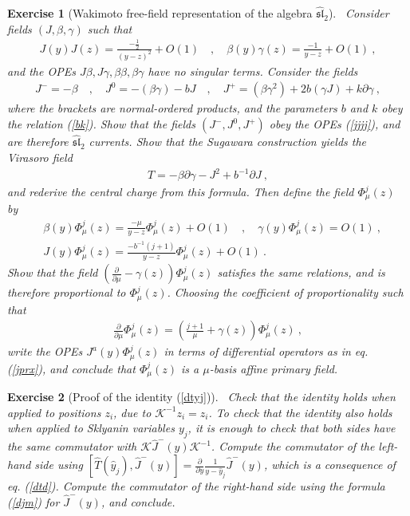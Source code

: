 \documentclass[12pt,a4paper,notitlepage]{report}
\newcommand \p {\partial}
\newcommand \pp[1] {{\frac{\p}{\p #1}}}
\numberwithin{equation}{section}
\theoremstyle{break}
\newtheorem{exo}{Exercise}[chapter]
\begin{document}
\begin{exo}[Wakimoto free-field representation of the algebra $\widehat{\mathfrak{sl}}_2$]
 ~\label{exowaki}
Consider fields $(J,\beta,\gamma)$ such that 
\begin{align}
 J(y)J(z) = \frac{-\frac12}{(y-z)^2} + O(1) \quad , \quad \beta(y)\gamma(z) = \frac{-1}{y-z} + O(1)\ ,
\end{align}
and the OPEs $J\beta,J\gamma,\beta\beta,\beta\gamma$ have no singular terms. Consider the fields 
\begin{align}
 J^- = -\beta \quad , \quad J^0 = -(\beta\gamma) - bJ \quad , \quad J^+ = (\beta\gamma^2)+2b(\gamma J)+k\p\gamma\ ,
\end{align}
where the brackets are normal-ordered products, and the parameters $b$ and $k$ obey the relation (\ref{bk}). Show that the fields $(J^-,J^0,J^+)$ obey the OPEs (\ref{jjjj}), and are therefore $\widehat{\mathfrak{sl}}_2$ currents. 
Show that the Sugawara construction yields the Virasoro field
\begin{align}
 T = -\beta \p\gamma - J^2 +b^{-1}\p J\ ,
\end{align}
and rederive the central charge from this formula.
Then define the field $\Phi^j_\mu(z)$ by 
\begin{align}
 & \beta(y)\Phi^j_\mu(z) = \frac{-\mu}{y-z}\Phi^j_\mu(z)+ O(1) \quad , \quad \gamma(y)\Phi^j_\mu(z)=O(1)\ , 
\\
 & J(y)\Phi^j_\mu(z) = \frac{-b^{-1}(j+1)}{y-z}\Phi^j_\mu(z)+ O(1)\ .
\end{align}
Show that the field $\left(\pp{\mu}-\gamma(z)\right)\Phi^j_\mu(z)$ satisfies the same relations, and is therefore proportional to $\Phi^j_\mu(z)$. Choosing the coefficient of proportionality such that
\begin{align}
 \pp{\mu}\Phi^j_\mu(z) =\left(\frac{j+1}{\mu}+\gamma(z)\right)\Phi^j_\mu(z)\ ,
\end{align}
write the OPEs $J^a(y)\Phi^j_\mu(z)$ in terms of differential operators as in eq. (\ref{jprx}), and conclude that $\Phi^j_\mu(z)$ is a $\mu$-basis affine primary field.
\end{exo}

\begin{exo}[Proof of the identity (\ref{dtyj})]
 ~\label{exoktk}
Check that the identity holds when applied to positions $z_i$, due to $\mathcal{K}^{-1}z_i = z_i$. 
To check that the identity also holds when applied to Sklyanin variables $y_j$, it is enough to check 
that both sides have the same commutator with $\mathcal{K}\hat{J}^-(y)\mathcal{K}^{-1}$. 
Compute the commutator of the left-hand side using $[\hat{T}(\hat{y}_j),\hat{J}^-(y)]=\pp{y}\frac{1}{y-\hat{y}_j}\hat{J}^-(y)$, which is a consequence of eq. (\ref{dtd}). Compute the commutator of the 
right-hand side using the formula (\ref{djm}) for $\hat{J}^-(y)$, and conclude.
\end{exo}


\printindex





%
\end{document}
